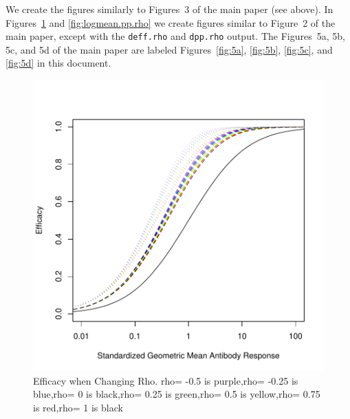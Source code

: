 \documentclass{article}[12pt]
\begin{document}
We create the figures similarly to Figures~3 of the main paper (see above). 
In Figures~\ref{fig:logmean.eff.rho} and \ref{fig:logmean.pp.rho} we create figures similar to Figure~2 of the main 
paper, except with the \texttt{deff.rho} and \texttt{dpp.rho} output. 
The Figures~5a, 5b, 5c, and 5d of the main paper 
are labeled  Figures~\ref{fig:5a}, \ref{fig:5b}, \ref{fig:5c}, and \ref{fig:5d}  in this document.


\begin{figure}
\caption{Efficacy when Changing Rho.
rho= -0.5  is  purple,rho= -0.25  is  blue,rho= 0  is  black,rho= 0.25  is  green,rho= 0.5  is  yellow,rho= 0.75  is  red,rho= 1  is  black
 \label{fig:logmean.eff.rho} }
\includegraphics{hbimdetails-figLogmeanEffMu}
\end{figure}
\end{document}
